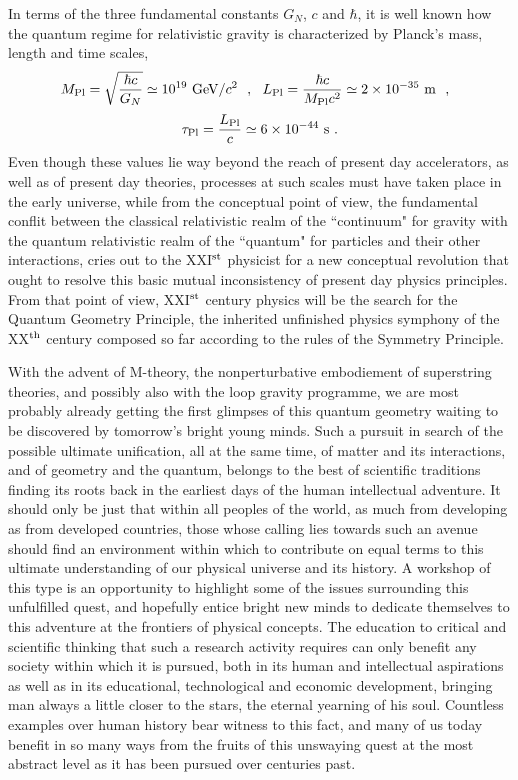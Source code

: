 \documentclass[a4paper,11pt]{article}
\begin{document}
In terms of the three fundamental constants $G_N$, $c$ and $\hbar$, it is well
known how the quantum regime for relativistic gravity is characterized
by Planck's mass, length and time scales,
\begin{displaymath}
M_{\rm Pl}=\sqrt{\frac{\hbar c}{G_N}}\simeq 10^{19}\ {\rm GeV}/c^2\ \ ,\ \ 
L_{\rm Pl}=\frac{\hbar c}{M_{\rm Pl}c^2}\simeq 2\times 10^{-35}\ {\rm m}
\ \ ,\ \ 
\end{displaymath}
\begin{equation}
\tau_{\rm Pl}=\frac{L_{\rm Pl}}{c}\simeq 6\times 10^{-44}\ {\rm s}\ .
\end{equation}
Even though these values lie way beyond the reach of present day
accelerators, as well as of present day theories, processes at such scales 
must have taken place in the early universe, while from the conceptual point 
of view, the fundamental conflit between the classical relativistic realm of
the ``continuum" for gravity with the quantum relativistic realm
of the ``quantum" for particles and their other interactions, cries out
to the XXI$^{\rm st}$ physicist for a new conceptual revolution
that ought to resolve this basic mutual inconsistency of present day
physics principles. From that point of view, XXI$^{\rm st}$ century
physics will be the search for the Quantum Geometry Principle,
the inherited unfinished physics symphony of the XX$^{\rm th}$ century
composed so far according to the rules of the Symmetry Principle.

With the advent of M-theory,\cite{Pol} the nonperturbative embodiement of
superstring theories,\cite{GSW} and possibly also with the loop gravity 
programme,\cite{Loop}
we are most probably already getting the first glimpses of this
quantum geometry wai\-ting to be discovered by tomorrow's bright
young minds. Such a pursuit in search of the possible ultimate
unification, all at the same time, of matter and its interactions, and of 
geometry and the quantum, belongs to the best of scientific traditions finding 
its roots back in the earliest days of the human intellectual adventure. 
It should only be just that within all peoples of the world, as much
from developing as from developed countries, those whose
calling lies towards such an avenue should find an environment
within which to contribute on equal terms to this ultimate understanding
of our physical universe and its history. A workshop of this type
is an opportunity to highlight some of the issues surrounding this
unfulfilled quest, and hopefully entice bright new minds to dedicate
themselves to this adventure at the frontiers of physical concepts. 
The education to critical and scientific thinking that such a research 
activity requires can only benefit any society within which it is pursued, 
both in its human and intellectual aspirations as well as in its 
edu\-ca\-tio\-nal,
technological and economic development, bringing man always a little closer 
to the stars, the eternal yearning of his soul. Countless examples over human
history bear witness to this fact, and many of us today benefit in so many
ways from the fruits of this unswaying quest at the most abstract level as it 
has been pursued over centuries past.
\end{document}
